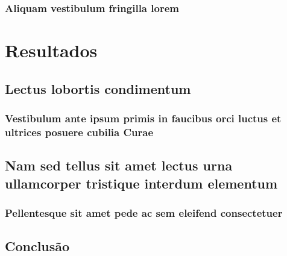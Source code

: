 \documentclass[
	12pt,				%
	openright,			%
	twoside,			%
	a4paper,			%
	english,			%
	brazil				%
	]{abntex2}
\begin{document}
\section{Aliquam vestibulum fringilla lorem}

\lipsum[1]

\lipsum[2-3]

\part{Resultados}

\chapter{Lectus lobortis condimentum}

\section{Vestibulum ante ipsum primis in faucibus orci luctus et ultrices
posuere cubilia Curae}

\lipsum[21-22]

\chapter{Nam sed tellus sit amet lectus urna ullamcorper tristique interdum
elementum}

\section{Pellentesque sit amet pede ac sem eleifend consectetuer}

\lipsum[24]


\chapter{Conclusão}
\end{document}
